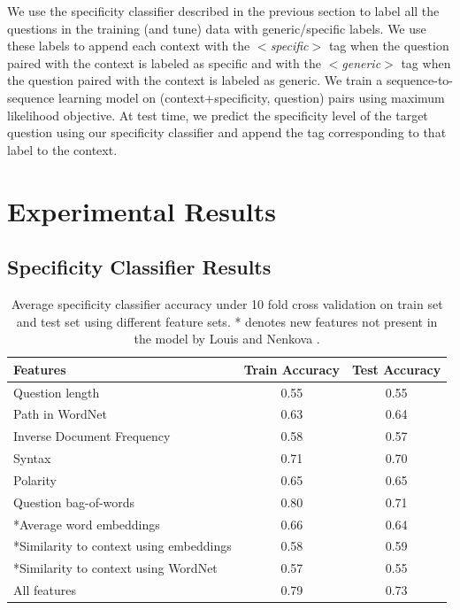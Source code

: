 \documentclass[11pt,a4paper]{article}
\begin{document}
We use the specificity classifier described in the previous section to label all the questions in the training (and tune) data with generic/specific labels. 
We use these labels to append each context with the \textit{$<$specific$>$} tag when the question paired with the context is labeled as specific and with the \textit{$<$generic$>$} tag when the question paired with the context is labeled as generic.
We train a sequence-to-sequence learning model \cite{sutskever2014sequence} on (context+specificity, question) pairs using maximum likelihood objective. 
At test time, we predict the specificity level of the target question using our specificity classifier and append the tag corresponding to that label to the context. 

\section{Experimental Results}

\subsection{Specificity Classifier Results}

\begin{table}[t]
\centering
\begin{tabular}{lcc}
\toprule
Features & Train Accuracy & Test Accuracy \\
\midrule
Question length & 0.55 & 0.55 \\
Path in WordNet & 0.63 & 0.64 \\
Inverse Document Frequency & 0.58 & 0.57 \\
Syntax & 0.71 & 0.70 \\
Polarity & 0.65 & 0.65 \\
Question bag-of-words & 0.80 & 0.71 \\
*Average word embeddings & 0.66 & 0.64 \\
*Similarity to context using embeddings & 0.58 & 0.59 \\
*Similarity to context using WordNet & 0.57 & 0.55 \\
All features &  0.79 &  0.73 \\
\bottomrule
\end{tabular}
\caption{Average specificity classifier accuracy under 10 fold cross validation on train set and test set using different feature sets. 
* denotes new features not present in the model by Louis and Nenkova \cite{louis2011automatic}.}\label{tab:specificity-classifier-results}
\end{table}
\end{document}
